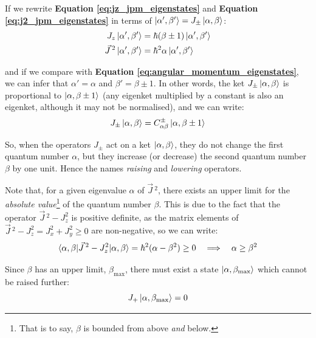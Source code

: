 If we rewrite \textbf{Equation \ref{eq:jz_jpm_eigenstates}} and \textbf{Equation \ref{eq:j2_jpm_eigenstates}} in terms of $\ket{\alpha',\beta'} = J_\pm \ket{\alpha,\beta}$:
\begin{equation}
    \begin{split}
        J_z\ket{\alpha', \beta'} &= \hbar(\beta \pm 1)\ket{\alpha', \beta'} \\
        \vec{J}\,^2\ket{\alpha', \beta'} &= \hbar^2\alpha\ket{\alpha', \beta'}
    \end{split}
\end{equation}

and if we compare with \textbf{Equation \ref{eq:angular_momentum_eigenstates}}, we can infer that $\alpha' = \alpha$ and $\beta' = \beta \pm 1$. In other words, the ket $J_\pm\ket{\alpha,\beta}$ is proportional to $\ket{\alpha, \beta\pm 1}$ (any eigenket multiplied by a constant is also an eigenket, although it may not be normalised), and we can write:
\begin{equation} \label{eq:j_p_and_j_m_eigenstates}
    J_\pm\ket{\alpha, \beta} = C_{\alpha\beta}^\pm\ket{\alpha, \beta\pm 1}
\end{equation}

So, when the operators $J_\pm$ act on a ket $\ket{\alpha, \beta}$, they do not change the first quantum number $\alpha$, but they increase (or decrease) the second quantum number $\beta$ by one unit. Hence the names \textit{raising} and \textit{lowering} operators.

Note that, for a given eigenvalue $\alpha$ of $\vec{J}\,^2$, there exists an upper limit for the \textit{absolute value}\footnote{That is to say, $\beta$ is bounded from above \textit{and} below.} of the quantum number $\beta$. This is due to the fact that the operator $\vec{J}\,^2 - J_z^2$ is positive definite, as the matrix elements of $\vec{J}\,^2 - J_z^2 = J_x^2 + J_y^2 \geq 0$ are non-negative, so we can write:
\begin{equation}
    \braket{\alpha, \beta| \vec{J}\,^2 - J_z^2 | \alpha, \beta} = \hbar^2(\alpha - \beta^2) \geq 0\quad \Longrightarrow\quad \alpha \geq\beta^2
\end{equation} 

Since $\beta$ has an upper limit, $\beta_\text{max}$, there must exist a state $\ket{\alpha, \beta_\text{max}}$ which cannot be raised further:
\begin{equation}
    J_+\ket{\alpha, \beta_\text{max}} = 0
\end{equation}


